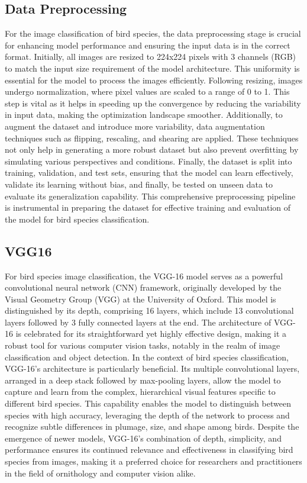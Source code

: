 \subsection{Data Preprocessing}
For the image classification of bird species, the data preprocessing stage is crucial for enhancing model performance and ensuring the input data is in the correct format. Initially, all images are resized to 224x224 pixels with 3 channels (RGB) to match the input size requirement of the model architecture. This uniformity is essential for the model to process the images efficiently. Following resizing, images undergo normalization, where pixel values are scaled to a range of 0 to 1. This step is vital as it helps in speeding up the convergence by reducing the variability in input data, making the optimization landscape smoother. Additionally, to augment the dataset and introduce more variability, data augmentation techniques such as flipping, rescaling, and shearing are applied. These techniques not only help in generating a more robust dataset but also prevent overfitting by simulating various perspectives and conditions. Finally, the dataset is split into training, validation, and test sets, ensuring that the model can learn effectively, validate its learning without bias, and finally, be tested on unseen data to evaluate its generalization capability. This comprehensive preprocessing pipeline is instrumental in preparing the dataset for effective training and evaluation of the model for bird species classification.

\subsection{VGG16}
For bird species image classification, the VGG-16 model serves as a powerful convolutional neural network (CNN) framework, originally developed by the Visual Geometry Group (VGG) at the University of Oxford. This model is distinguished by its depth, comprising 16 layers, which include 13 convolutional layers followed by 3 fully connected layers at the end. The architecture of VGG-16 is celebrated for its straightforward yet highly effective design, making it a robust tool for various computer vision tasks, notably in the realm of image classification and object detection. In the context of bird species classification, VGG-16's architecture is particularly beneficial. Its multiple convolutional layers, arranged in a deep stack followed by max-pooling layers, allow the model to capture and learn from the complex, hierarchical visual features specific to different bird species. This capability enables the model to distinguish between species with high accuracy, leveraging the depth of the network to process and recognize subtle differences in plumage, size, and shape among birds. Despite the emergence of newer models, VGG-16's combination of depth, simplicity, and performance ensures its continued relevance and effectiveness in classifying bird species from images, making it a preferred choice for researchers and practitioners in the field of ornithology and computer vision alike.


